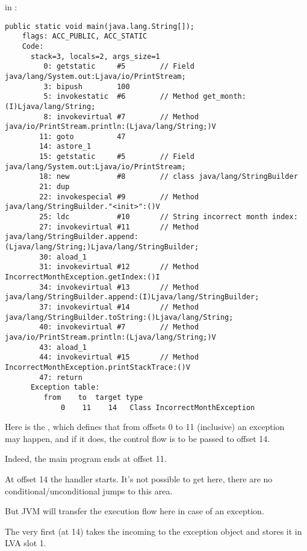 \main in :

\begin{lstlisting}[caption=Month2.class]
  public static void main(java.lang.String[]);
    flags: ACC_PUBLIC, ACC_STATIC
    Code:
      stack=3, locals=2, args_size=1
         0: getstatic     #5        // Field java/lang/System.out:Ljava/io/PrintStream;
         3: bipush        100
         5: invokestatic  #6        // Method get_month:(I)Ljava/lang/String;
         8: invokevirtual #7        // Method java/io/PrintStream.println:(Ljava/lang/String;)V
        11: goto          47
        14: astore_1      
        15: getstatic     #5        // Field java/lang/System.out:Ljava/io/PrintStream;
        18: new           #8        // class java/lang/StringBuilder
        21: dup           
        22: invokespecial #9        // Method java/lang/StringBuilder."<init>":()V
        25: ldc           #10       // String incorrect month index: 
        27: invokevirtual #11       // Method java/lang/StringBuilder.append:(Ljava/lang/String;)Ljava/lang/StringBuilder;
        30: aload_1       
        31: invokevirtual #12       // Method IncorrectMonthException.getIndex:()I
        34: invokevirtual #13       // Method java/lang/StringBuilder.append:(I)Ljava/lang/StringBuilder;
        37: invokevirtual #14       // Method java/lang/StringBuilder.toString:()Ljava/lang/String;
        40: invokevirtual #7        // Method java/io/PrintStream.println:(Ljava/lang/String;)V
        43: aload_1       
        44: invokevirtual #15       // Method IncorrectMonthException.printStackTrace:()V
        47: return        
      Exception table:
         from    to  target type
             0    11    14   Class IncorrectMonthException
\end{lstlisting}

Here is the , which defines that from offsets 0 to 11 (inclusive) an exception \\
 may happen, and if it does, the control flow is to be passed to offset 14.

Indeed, the main program ends at offset 11.

At offset 14 the handler starts. It's not possible to get here, 
there are no conditional/unconditional jumps to this area.

But \ac{JVM} will transfer the execution flow here in case of an exception.

The very first  (at 14) takes the incoming  to the exception object 
and stores it in \ac{LVA} slot 1.

